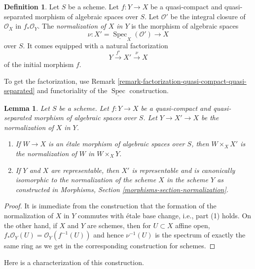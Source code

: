 \documentclass{stacks-project}
\theoremstyle{plain}
\newtheorem{lemma}[subsection]{Lemma}
\theoremstyle{definition}
\newtheorem{definition}[subsection]{Definition}
\theoremstyle{remark}
\numberwithin{equation}{subsection}
\def\Spec{\mathop{\mathrm{Spec}}}
\begin{document}
\begin{definition}
\label{definition-normalization-X-in-Y}
Let $S$ be a scheme. Let $f : Y \to X$ be a quasi-compact and quasi-separated
morphism of algebraic spaces over $S$. Let $\mathcal{O}'$ be the integral
closure of $\mathcal{O}_X$ in $f_*\mathcal{O}_Y$. The {\it normalization of
$X$ in $Y$} is the morphism of algebraic spaces
$$
\nu : X' = \underline{\Spec}_X(\mathcal{O}') \to X
$$
over $S$. It comes equipped with a natural factorization
$$
Y \xrightarrow{f'} X' \xrightarrow{\nu} X
$$
of the initial morphism $f$.
\end{definition}

\noindent
To get the factorization, use Remark
\ref{remark-factorization-quasi-compact-quasi-separated}
and functoriality of the $\underline{\Spec}$ construction.

\begin{lemma}
\label{lemma-properties-normalization}
Let $S$ be a scheme. Let $f : Y \to X$ be a quasi-compact and quasi-separated
morphism of algebraic spaces over $S$. Let $Y \to X' \to X$ be the
normalization of $X$ in $Y$.
\begin{enumerate}
\item If $W \to X$ is an \'etale morphism of algebraic spaces over $S$,
then $W \times_X X'$ is the normalization of $W$ in $W \times_X Y$.
\item If $Y$ and $X$ are representable, then $X'$ is representable
and is canonically isomorphic to the normalization of the scheme $X$
in the scheme $Y$ as constructed in
Morphisms, Section \ref{morphisms-section-normalization}.
\end{enumerate}
\end{lemma}

\begin{proof}
It is immediate from the construction that the formation
of the normalization of $X$ in $Y$ commutes with \'etale
base change, i.e., part (1) holds. On the other hand, if
$X$ and $Y$ are schemes, then for $U \subset X$ affine open,
$f_*\mathcal{O}_Y(U) = \mathcal{O}_Y(f^{-1}(U))$ and hence
$\nu^{-1}(U)$ is the spectrum of exactly the same ring as
we get in the corresponding construction for schemes.
\end{proof}

\noindent
Here is a characterization of this construction.
\end{document}
